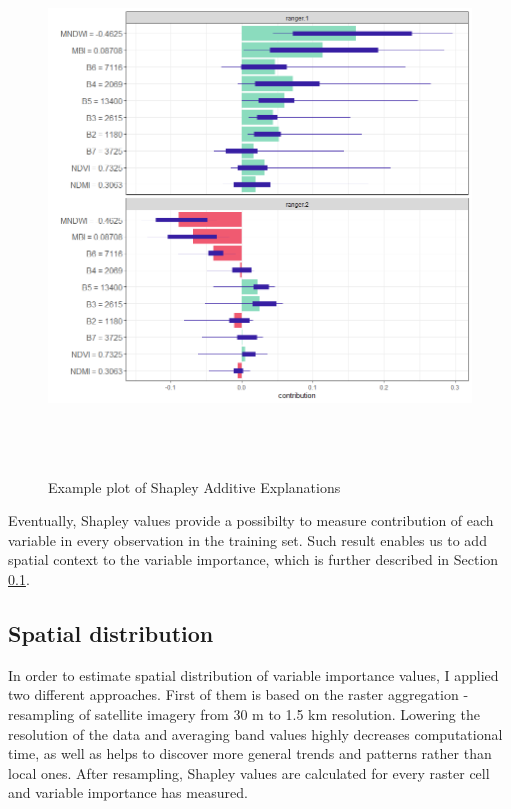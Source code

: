 \documentclass{amuthesis}
\begin{document}
\begin{figure}[H]

{\centering \includegraphics[width=5.20833in,height=5.57292in]{./figures/shapley_values.png}

}

\caption{\label{fig-rycina8}Example plot of Shapley Additive
Explanations}

\end{figure}

Eventually, Shapley values provide a possibilty to measure contribution
of each variable in every observation in the training set. Such result
enables us to add spatial context to the variable importance, which is
further described in Section \ref{sec-importance-distribution}.

\hypertarget{sec-importance-distribution}{%
\subsection{Spatial distribution}\label{sec-importance-distribution}}

In order to estimate spatial distribution of variable importance values,
I applied two different approaches. First of them is based on the raster
aggregation - resampling of satellite imagery from 30 m to 1.5 km
resolution. Lowering the resolution of the data and averaging band
values highly decreases computational time, as well as helps to discover
more general trends and patterns rather than local ones. After
resampling, Shapley values are calculated for every raster cell and
variable importance has measured.
\end{document}
